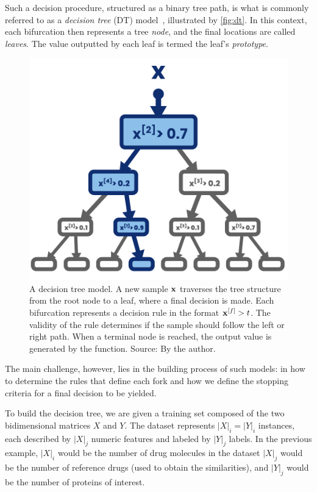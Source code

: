 Such a decision procedure, structured as a binary tree path, is what is commonly referred to as a \emph{decision tree} (DT) model~\cite{breiman1984classification}, illustrated by \autoref{fig:dt}. 
In this context, each bifurcation then represents a tree \emph{node}, and the final locations are called \emph{leaves}. The value outputted by each leaf is termed the leaf's \emph{prototype}.
%

\begin{figure}
    \centering
    \includegraphics[width=.5\textwidth]{figures/decision_tree.pdf}
    \caption{
        A decision tree model. A new sample $\mathbf{x}$ traverses the tree structure from the root node to a leaf, where a final decision is made. Each bifurcation represents a decision rule in the format $\mathbf{x}^{[f]} > t$. The validity of the rule determines if the sample should follow the left or right path. When a terminal node is reached, the output value is generated by the \prototype{} function.
        \newline Source: By the author.
    }
    \label{fig:dt}
\end{figure}

The main challenge, however, lies in the building process of such models: in how to determine the rules that define each fork and how we define the stopping criteria for a final decision to be yielded.

To build the decision tree, we are given a training set composed of the two bidimensional matrices $X$ and $Y$. The dataset represents $|X|_i = |Y|_i$ instances, each described by $|X|_j$ numeric features and labeled by $|Y|_j$ labels.
In the previous example, $|X|_i$ would be the number of drug molecules in the dataset
$|X|_j$ would be the number of reference drugs (used to obtain the similarities), and $|Y|_j$ would be the number of proteins of interest.

